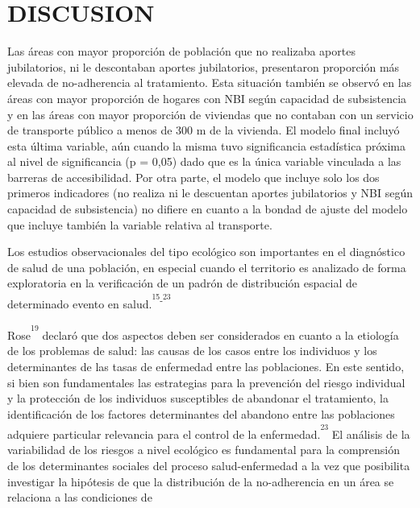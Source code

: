 \begin{multicols}{2}
{{}
}
\par

\section*{DISCUSION}
\par{}Las áreas con mayor proporción de población que no realizaba aportes jubilatorios,\allowbreak{} ni le descontaban aportes jubilatorios,\allowbreak{} presentaron proporción más elevada de no-\allowbreak{}adherencia al tratamiento.\allowbreak{} Esta situación también se observó en las áreas con mayor proporción de hogares con NBI según capacidad de subsistencia y en las áreas con mayor proporción de viviendas que no contaban con un servicio de transporte público a menos de 300 m de la vivienda.\allowbreak{} El modelo final incluyó esta última variable,\allowbreak{} aún cuando la misma tuvo significancia estadística próxima al nivel de significancia (\allowbreak{}p = 0,\allowbreak{}05)\allowbreak{} dado que es la única variable vinculada a las barreras de accesibilidad.\allowbreak{} Por otra parte,\allowbreak{} el modelo que incluye solo los dos primeros indicadores (\allowbreak{}no realiza ni le descuentan aportes jubilatorios y NBI según capacidad de subsistencia)\allowbreak{} no difiere en cuanto a la bondad de ajuste del modelo que incluye también la variable relativa al transporte.\allowbreak{}\par{}Los estudios observacionales del tipo ecológico son importantes en el diagnóstico de salud de una población,\allowbreak{} en especial cuando el territorio es analizado de forma exploratoria en la verificación de un padrón de distribución espacial de determinado evento en salud.\allowbreak{}\textsuperscript{\textsuperscript{15}}\textsuperscript{-\allowbreak{}}\textsuperscript{\textsuperscript{23}}\par{}Rose\textsuperscript{\textsuperscript{19}} declaró que dos aspectos deben ser considerados en cuanto a la etiología de los problemas de salud:\allowbreak{} las causas de los casos entre los individuos y los determinantes de las tasas de enfermedad entre las poblaciones.\allowbreak{} En este sentido,\allowbreak{} si bien son fundamentales las estrategias para la prevención del riesgo individual y la protección de los individuos susceptibles de abandonar el tratamiento,\allowbreak{} la identificación de los factores determinantes del abandono entre las poblaciones adquiere particular relevancia para el control de la enfermedad.\allowbreak{}\textsuperscript{\textsuperscript{23}} El análisis de la variabilidad de los riesgos a nivel ecológico es fundamental para la comprensión de los determinantes sociales del proceso salud-\allowbreak{}enfermedad a la vez que posibilita investigar la hipótesis de que la distribución de la no-\allowbreak{}adherencia en un área se relaciona a las condiciones de 
\end{multicols}
